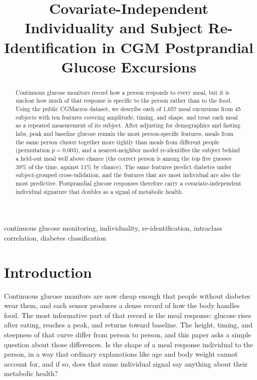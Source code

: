 \documentclass[10pt,conference,compsoc]{IEEEtran}
\begin{document}
\title{Covariate-Independent Individuality and Subject Re-Identification in CGM
Postprandial Glucose Excursions}

\author{
}

\maketitle

\begin{abstract}
Continuous glucose monitors record how a person responds to every meal, but it is
unclear how much of that response is specific to the person rather than to the
food. Using the public CGMacros dataset, we describe each of 1{,}657 meal
excursions from 45 subjects with ten features covering amplitude, timing, and
shape, and treat each meal as a repeated measurement of its subject. After
adjusting for demographics and fasting labs, peak and baseline glucose remain the
most person-specific features, meals from the same person cluster together more
tightly than meals from different people (permutation $p = 0.003$), and a
nearest-neighbor model re-identifies the subject behind a held-out meal well
above chance (the correct person is among the top five guesses 39\% of the time,
against 11\% by chance). The same features predict diabetes under subject-grouped
cross-validation, and the features that are most individual are also the most
predictive. Postprandial glucose responses therefore carry a covariate-independent
individual signature that doubles as a signal of metabolic health.
\end{abstract}

\begin{IEEEkeywords}
continuous glucose monitoring, individuality, re-identification, intraclass
correlation, diabetes classification
\end{IEEEkeywords}

\section{Introduction}

Continuous glucose monitors are now cheap enough that people without diabetes
wear them, and each sensor produces a dense record of how the body handles food.
The most informative part of that record is the meal response: glucose rises
after eating, reaches a peak, and returns toward baseline. The height, timing,
and steepness of that curve differ from person to person, and this paper asks a
simple question about those differences. Is the shape of a meal response
individual to the person, in a way that ordinary explanations like age and body
weight cannot account for, and if so, does that same individual signal say
anything about their metabolic health?
\end{document}

